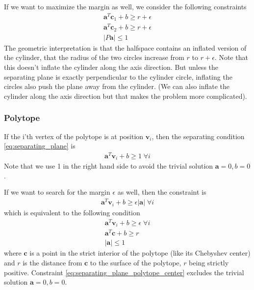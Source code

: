 \documentclass{article}
\renewcommand{\vec}[1]{\mathbf{#1}}
\begin{document}
If we want to maximize the margin as well, we consider the following constraints
\begin{subequations}
\begin{align}
	\vec{a}^T\vec{c}_1 + b \ge r + \epsilon\\
	\vec{a}^T\vec{c}_2 + b \ge r + \epsilon\\
	|P\vec{a}|\le 1
\end{align}
\label{eq:separating_plane_cylinder3}
\end{subequations}
The geometric interpretation is that the halfspace contains an inflated version of the cylinder, that the radius of the two circles increase from $r$ to $r + \epsilon$. Note that this doesn't inflate the cylinder along the axis direction. But unless the separating plane is exactly perpendicular to the cylinder circle, inflating the circles also push the plane away from the cylinder. (We can also inflate the cylinder along the axis direction but that makes the problem more complicated).

\subsubsection{Polytope}
If the i'th vertex of the polytope is at position $\vec{v}_i$, then the separating condition \eqref{eq:separating_plane} is
\begin{align}
	\vec{a}^T\vec{v}_i + b \ge 1 \;\forall i
\end{align}
Note that we use 1 in the right hand side to avoid the trivial solution $\vec{a}=0, b=0$.

If we want to search for the margin $\epsilon$ as well, then the constraint is
\begin{subequations}
\begin{align}
	\vec{a}^T\vec{v}_i + b \ge \epsilon |\vec{a}|\;\forall i
\end{align}
\end{subequations}
which is equivalent to the following condition
\begin{align}
	\vec{a}^T\vec{v}_i + b \ge \epsilon\;\forall i\\
	\vec{a}^T\vec{c} + b \ge r\label{eq:separating_plane_polytope_center}\\
	|\vec{a}|\le 1
\end{align}
where $\vec{c}$ is a point in the strict interior of the polytope (like its Chebyshev center) and $r$ is the distance from $\vec{c}$ to the surface of the polytope, $r$ being strictly positive. Constraint \eqref{eq:separating_plane_polytope_center} excludes the trivial solution $\vec{a}=0, b=0$.
\end{document}
